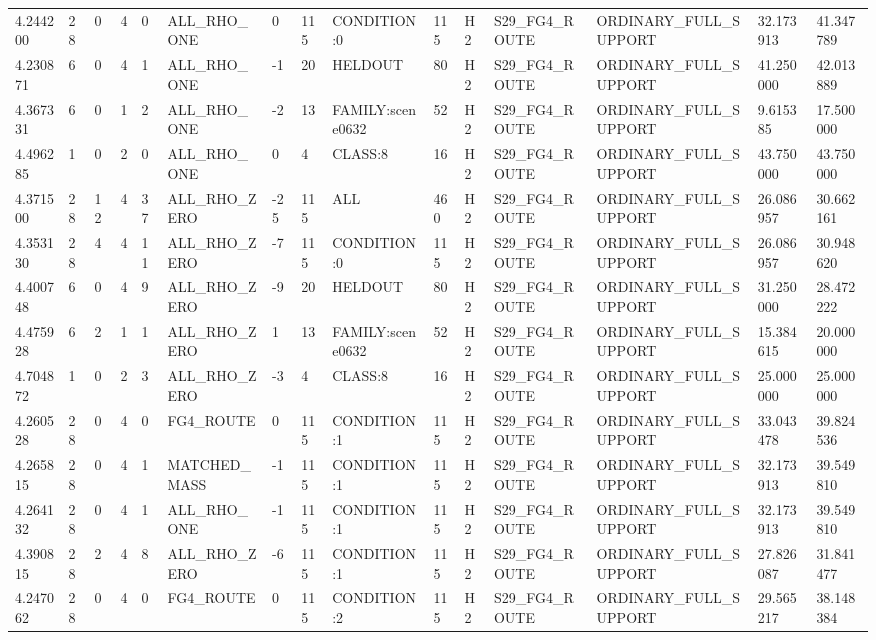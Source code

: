 \begin{tabular}{lllllllllllllll}
4.244200 & 28 & 0 & 4 & 0 & ALL\_RHO\_ONE & 0 & 115 & CONDITION:0 & 115 & H2 & S29\_FG4\_ROUTE & ORDINARY\_FULL\_SUPPORT & 32.173913 & 41.347789 \\
4.230871 & 6 & 0 & 4 & 1 & ALL\_RHO\_ONE & -1 & 20 & HELDOUT & 80 & H2 & S29\_FG4\_ROUTE & ORDINARY\_FULL\_SUPPORT & 41.250000 & 42.013889 \\
4.367331 & 6 & 0 & 1 & 2 & ALL\_RHO\_ONE & -2 & 13 & FAMILY:scene0632 & 52 & H2 & S29\_FG4\_ROUTE & ORDINARY\_FULL\_SUPPORT & 9.615385 & 17.500000 \\
4.496285 & 1 & 0 & 2 & 0 & ALL\_RHO\_ONE & 0 & 4 & CLASS:8 & 16 & H2 & S29\_FG4\_ROUTE & ORDINARY\_FULL\_SUPPORT & 43.750000 & 43.750000 \\
4.371500 & 28 & 12 & 4 & 37 & ALL\_RHO\_ZERO & -25 & 115 & ALL & 460 & H2 & S29\_FG4\_ROUTE & ORDINARY\_FULL\_SUPPORT & 26.086957 & 30.662161 \\
4.353130 & 28 & 4 & 4 & 11 & ALL\_RHO\_ZERO & -7 & 115 & CONDITION:0 & 115 & H2 & S29\_FG4\_ROUTE & ORDINARY\_FULL\_SUPPORT & 26.086957 & 30.948620 \\
4.400748 & 6 & 0 & 4 & 9 & ALL\_RHO\_ZERO & -9 & 20 & HELDOUT & 80 & H2 & S29\_FG4\_ROUTE & ORDINARY\_FULL\_SUPPORT & 31.250000 & 28.472222 \\
4.475928 & 6 & 2 & 1 & 1 & ALL\_RHO\_ZERO & 1 & 13 & FAMILY:scene0632 & 52 & H2 & S29\_FG4\_ROUTE & ORDINARY\_FULL\_SUPPORT & 15.384615 & 20.000000 \\
4.704872 & 1 & 0 & 2 & 3 & ALL\_RHO\_ZERO & -3 & 4 & CLASS:8 & 16 & H2 & S29\_FG4\_ROUTE & ORDINARY\_FULL\_SUPPORT & 25.000000 & 25.000000 \\
4.260528 & 28 & 0 & 4 & 0 & FG4\_ROUTE & 0 & 115 & CONDITION:1 & 115 & H2 & S29\_FG4\_ROUTE & ORDINARY\_FULL\_SUPPORT & 33.043478 & 39.824536 \\
4.265815 & 28 & 0 & 4 & 1 & MATCHED\_MASS & -1 & 115 & CONDITION:1 & 115 & H2 & S29\_FG4\_ROUTE & ORDINARY\_FULL\_SUPPORT & 32.173913 & 39.549810 \\
4.264132 & 28 & 0 & 4 & 1 & ALL\_RHO\_ONE & -1 & 115 & CONDITION:1 & 115 & H2 & S29\_FG4\_ROUTE & ORDINARY\_FULL\_SUPPORT & 32.173913 & 39.549810 \\
4.390815 & 28 & 2 & 4 & 8 & ALL\_RHO\_ZERO & -6 & 115 & CONDITION:1 & 115 & H2 & S29\_FG4\_ROUTE & ORDINARY\_FULL\_SUPPORT & 27.826087 & 31.841477 \\
4.247062 & 28 & 0 & 4 & 0 & FG4\_ROUTE & 0 & 115 & CONDITION:2 & 115 & H2 & S29\_FG4\_ROUTE & ORDINARY\_FULL\_SUPPORT & 29.565217 & 38.148384 \\

\end{tabular}
